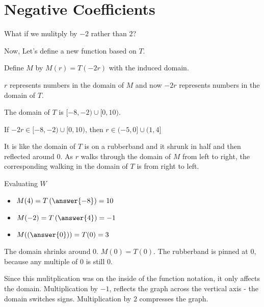 \documentclass{ximera}
\begin{document}
\section{Negative Coefficients}


What if we mulitply by $-2$ rather than $2$?













Now, Let's define a new function based on $T$.



Define $M$ by $M(r) = T(-2r)$ with the induced domain.



$r$ represents numbers in the domain of $M$ and now $-2r$ represents numbers in the domain of $T$.  

The domain of $T$ is $[-8,-2) \cup [0,10)$.


If $-2r \in [-8,-2) \cup [0,10)$, then $r \in (-5,0] \cup (1, 4]$

It is like the domain of $T$ is on a rubberband and it shrunk in half and then reflected around $0$.  As $r$ walks through the domain of $M$ from left to right, the corresponding walking in the domain of $T$ is from right to left.



\begin{example}  Evaluating $W$

\begin{itemize}
\item $M(4) = T\left(\answer{-8}\right) = 10$
\item $M(-2) = T\left(\answer{4}\right) = -1$
\item $M(\left(\answer{0}\right)) = T(0) = 3$
\end{itemize}


\end{example}


The domain shrinks around $0$. $M(0) = T(0)$.  The rubberband is pinned at $0$, because any multiple of $0$ is still $0$.  









Since this mulitplication was on the inside of the function notation, it only affects the domain.  Multiplication by $-1$, reflects the graph across the vertical axis - the domain switches signs. Multiplication by $2$ compresses the graph.
\end{document}
